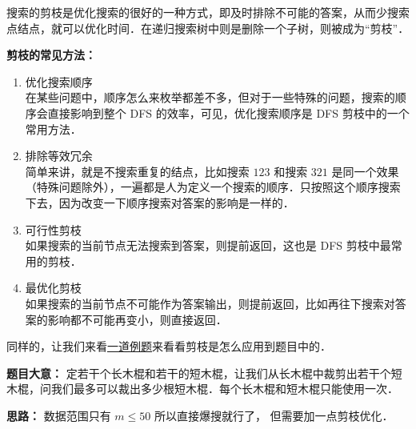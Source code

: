 搜索的剪枝是优化搜索的很好的一种方式，即及时排除不可能的答案，从而少搜索点结点，就可以优化时间．在递归搜索树中则是删除一个子树，则被成为“剪枝”．

\textbf{剪枝的常见方法：}

\begin{enumerate}
\item 优化搜索顺序\\
在某些问题中，顺序怎么来枚举都差不多，但对于一些特殊的问题，搜索的顺序会直接影响到整个 DFS 的效率，可见，优化搜索顺序是 DFS 剪枝中的一个常用方法．

\item 排除等效冗余 \\
简单来讲，就是不搜索重复的结点，比如搜索 $123$ 和搜索 $321$ 是同一个效果（特殊问题除外），一遍都是人为定义一个搜索的顺序．只按照这个顺序搜索下去，因为改变一下顺序搜索对答案的影响是一样的．

\item 可行性剪枝\\
如果搜索的当前节点无法搜索到答案，则提前返回，这也是 DFS 剪枝中最常用的剪枝．

\item 最优化剪枝 \\
如果搜索的当前节点不可能作为答案输出，则提前返回，比如再往下搜索对答案的影响都不可能再变小，则直接返回．
\end{enumerate}

同样的，让我们来看\href{https://loj.ac/p/2148}{一道例题}来看看剪枝是怎么应用到题目中的．

\textbf{题目大意：}
定若干个长木棍和若干的短木棍，让我们从长木棍中裁剪出若干个短木棍，问我们最多可以裁出多少根短木棍．每个长木棍和短木棍只能使用一次．

\textbf{思路：}
数据范围只有 $m\leq50$ 所以直接爆搜就行了， 但需要加一点剪枝优化．
